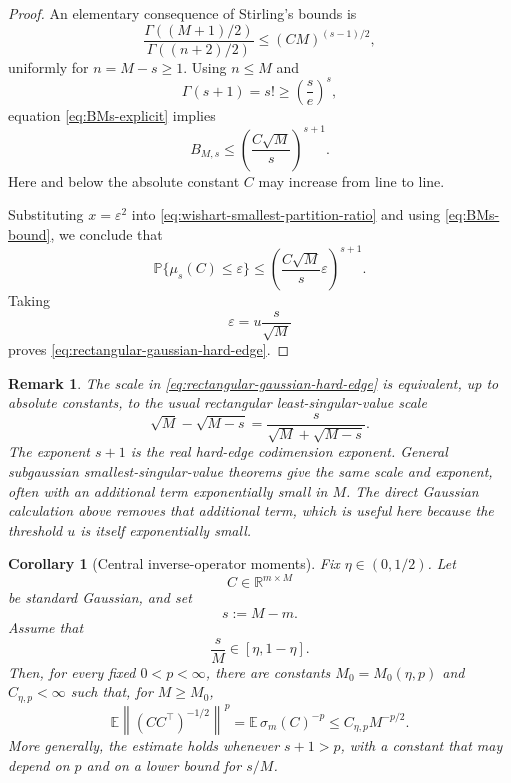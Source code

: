 \documentclass[11pt]{article}
\newtheorem{corollary}{Corollary}
\newtheorem{remark}{Remark}
\newcommand{\R}{\mathbb R}
\newcommand{\Pbb}{\mathbb P}
\newcommand{\Ebb}{\mathbb E}
\newcommand{\1}{\mathbf 1}
\begin{document}
\begin{proof}
An elementary consequence of Stirling's bounds is
\[
        \frac{\Gamma((M+1)/2)}
        {\Gamma((n+2)/2)}
        \le
        (CM)^{(s-1)/2},
\]
uniformly for \(n=M-s\ge1\).  Using \(n\le M\) and
\[
        \Gamma(s+1)=s!\ge\left(\frac{s}{e}\right)^s,
\]
equation \eqref{eq:BMs-explicit} implies
\begin{equation}
        B_{M,s}
        \le
        \left(\frac{C\sqrt M}{s}\right)^{s+1}.
        \label{eq:BMs-bound}
\end{equation}
Here and below the absolute constant \(C\) may increase from line to line.

Substituting \(x=\varepsilon^2\) into
\eqref{eq:wishart-smallest-partition-ratio} and using
\eqref{eq:BMs-bound}, we conclude that
\begin{equation}
        \Pbb\{\mu_s(C)\le\varepsilon\}
        \le
        \left(
        \frac{C\sqrt M}{s}\varepsilon
        \right)^{s+1}.
        \label{eq:rectangular-gaussian-hard-edge-unscaled}
\end{equation}
Taking
\[
        \varepsilon=u\frac{s}{\sqrt M}
\]
proves \eqref{eq:rectangular-gaussian-hard-edge}.
\end{proof}

\begin{remark}
The scale in \eqref{eq:rectangular-gaussian-hard-edge} is equivalent, up to absolute
constants, to the usual rectangular least-singular-value scale
\[
        \sqrt M-\sqrt{M-s}
        =
        \frac{s}{\sqrt M+\sqrt{M-s}}.
\]
The exponent \(s+1\) is the real hard-edge codimension exponent.  General subgaussian
smallest-singular-value theorems give the same scale and exponent, often with an additional
term exponentially small in \(M\).  The direct Gaussian calculation above removes that
additional term, which is useful here because the threshold \(u\) is itself exponentially
small.
\end{remark}

\begin{corollary}[Central inverse-operator moments]
\label{cor:central-inverse-operator-moments}
Fix \(\eta\in(0,1/2)\).  Let
\[
        C\in\R^{m\times M}
\]
be standard Gaussian, and set
\[
        s:=M-m.
\]
Assume that
\[
        \frac{s}{M}\in[\eta,1-\eta].
\]
Then, for every fixed \(0<p<\infty\), there are constants
\(M_0=M_0(\eta,p)\) and \(C_{\eta,p}<\infty\) such that, for
\(M\ge M_0\),
\begin{equation}
        \Ebb
        \left\|(CC^\top)^{-1/2}\right\|^p
        =
        \Ebb\,\sigma_m(C)^{-p}
        \le
        C_{\eta,p}M^{-p/2}.
        \label{eq:central-inverse-operator-moments}
\end{equation}
More generally, the estimate holds whenever \(s+1>p\), with a constant that may
depend on \(p\) and on a lower bound for \(s/M\).
\end{corollary}
\end{document}
